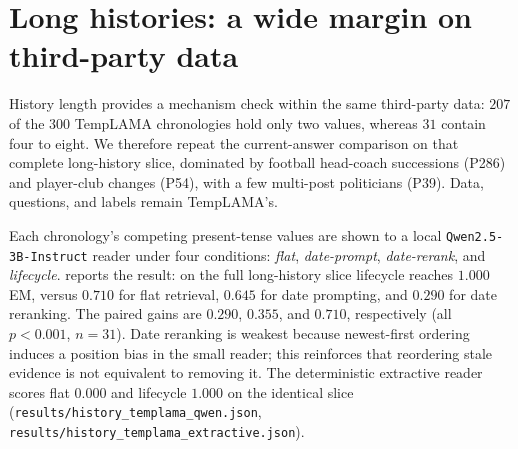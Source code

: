 \documentclass[letterpaper]{article}
\begin{document}
\section{Long histories: a wide margin on third-party data}
\label{sec:supp_longhist}
History length provides a mechanism check within the same third-party data: $207$ of the $300$ TempLAMA chronologies hold only two values, whereas $31$ contain four to eight. We therefore repeat the current-answer comparison on that complete long-history slice, dominated by football head-coach successions (P286) and player-club changes (P54), with a few multi-post politicians (P39). Data, questions, and labels remain TempLAMA's.

Each chronology's competing present-tense values are shown to a local \texttt{Qwen2.5-3B-Instruct} reader under four conditions: \emph{flat}, \emph{date-prompt}, \emph{date-rerank}, and \emph{lifecycle}.  reports the result: on the full long-history slice lifecycle reaches $1.000$ EM, versus $0.710$ for flat retrieval, $0.645$ for date prompting, and $0.290$ for date reranking. The paired gains are $0.290$, $0.355$, and $0.710$, respectively (all $p<0.001$, $n{=}31$). Date reranking is weakest because newest-first ordering induces a position bias in the small reader; this reinforces that reordering stale evidence is not equivalent to removing it. The deterministic extractive reader scores flat $0.000$ and lifecycle $1.000$ on the identical slice (\texttt{results/history\_templama\_qwen.json}, \texttt{results/history\_templama\_\allowbreak extractive.json}).
\end{document}
